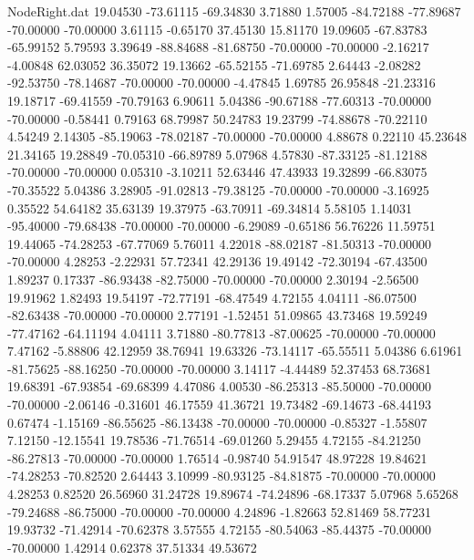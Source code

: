 \begin{filecontents}{NodeRight.dat}
  19.04530  -73.61115  -69.34830     3.71880    1.57005  -84.72188  -77.89687  -70.00000  -70.00000    3.61115   -0.65170   37.45130   15.81170
  19.09605  -67.83783  -65.99152     5.79593    3.39649  -88.84688  -81.68750  -70.00000  -70.00000   -2.16217   -4.00848   62.03052   36.35072
  19.13662  -65.52155  -71.69785     2.64443   -2.08282  -92.53750  -78.14687  -70.00000  -70.00000   -4.47845    1.69785   26.95848  -21.23316
  19.18717  -69.41559  -70.79163     6.90611    5.04386  -90.67188  -77.60313  -70.00000  -70.00000   -0.58441    0.79163   68.79987   50.24783
  19.23799  -74.88678  -70.22110     4.54249    2.14305  -85.19063  -78.02187  -70.00000  -70.00000    4.88678    0.22110   45.23648   21.34165
  19.28849  -70.05310  -66.89789     5.07968    4.57830  -87.33125  -81.12188  -70.00000  -70.00000    0.05310   -3.10211   52.63446   47.43933
  19.32899  -66.83075  -70.35522     5.04386    3.28905  -91.02813  -79.38125  -70.00000  -70.00000   -3.16925    0.35522   54.64182   35.63139
  19.37975  -63.70911  -69.34814     5.58105    1.14031  -95.40000  -79.68438  -70.00000  -70.00000   -6.29089   -0.65186   56.76226   11.59751
  19.44065  -74.28253  -67.77069     5.76011    4.22018  -88.02187  -81.50313  -70.00000  -70.00000    4.28253   -2.22931   57.72341   42.29136
  19.49142  -72.30194  -67.43500     1.89237    0.17337  -86.93438  -82.75000  -70.00000  -70.00000    2.30194   -2.56500   19.91962    1.82493
  19.54197  -72.77191  -68.47549     4.72155    4.04111  -86.07500  -82.63438  -70.00000  -70.00000    2.77191   -1.52451   51.09865   43.73468
  19.59249  -77.47162  -64.11194     4.04111    3.71880  -80.77813  -87.00625  -70.00000  -70.00000    7.47162   -5.88806   42.12959   38.76941
  19.63326  -73.14117  -65.55511     5.04386    6.61961  -81.75625  -88.16250  -70.00000  -70.00000    3.14117   -4.44489   52.37453   68.73681
  19.68391  -67.93854  -69.68399     4.47086    4.00530  -86.25313  -85.50000  -70.00000  -70.00000   -2.06146   -0.31601   46.17559   41.36721
  19.73482  -69.14673  -68.44193     0.67474   -1.15169  -86.55625  -86.13438  -70.00000  -70.00000   -0.85327   -1.55807    7.12150  -12.15541
  19.78536  -71.76514  -69.01260     5.29455    4.72155  -84.21250  -86.27813  -70.00000  -70.00000    1.76514   -0.98740   54.91547   48.97228
  19.84621  -74.28253  -70.82520     2.64443    3.10999  -80.93125  -84.81875  -70.00000  -70.00000    4.28253    0.82520   26.56960   31.24728
  19.89674  -74.24896  -68.17337     5.07968    5.65268  -79.24688  -86.75000  -70.00000  -70.00000    4.24896   -1.82663   52.81469   58.77231
  19.93732  -71.42914  -70.62378     3.57555    4.72155  -80.54063  -85.44375  -70.00000  -70.00000    1.42914    0.62378   37.51334   49.53672

\end{filecontents}
